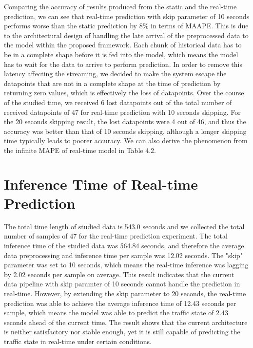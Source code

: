 \documentclass[11pt]{uonthesis}
\begin{document}
Comparing the accuracy of results produced from the static and the real-time prediction, we can see that real-time prediction with skip parameter of 10 seconds performs worse than the static prediction by 8\% in terms of MAAPE. This is due to the architectural design of handling the late arrival of the preprocessed data to the model within the proposed framework. Each chunk of historical data has to be in a complete shape before it is fed into the model, which means the model has to wait for the data to arrive to perform prediction. In order to remove this latency affecting the streaming, we decided to make the system escape the datapoints that are not in a complete shape at the time of prediction by returning zero values, which is effectively the loss of datapoints. Over the course of the studied time, we received 6 lost datapoints out of the total number of received datapoints of 47 for real-time prediction with 10 seconds skipping. For the 20 seconds skipping result, the lost datapoints were 4 out of 46, and thus the accuracy was better than that of 10 seconds skipping, although a longer skipping time typically leads to poorer accuracy. We can also derive the phenomenon from the infinite MAPE of real-time model in Table 4.2. %

\section{Inference Time of Real-time Prediction}

The total time length of studied data is 543.0 seconds and we collected the total number of samples of 47 for the real-time prediction experiment. The total inference time of the studied data was 564.84 seconds, and therefore the average data preprocessing and inference time per sample was 12.02 seconds. The "skip" parameter was set to 10 seconds, which means the real-time inference was lagging by 2.02 seconds per sample on average. This result indicates that the current data pipeline with skip paramter of 10 seconds cannot handle the prediction in real-time. However, by extending the skip parameter to 20 seconds, the real-time prediction was able to achieve the average inference time of 12.43 seconds per sample, which means the model was able to predict the traffic state of 2.43 seconds ahead of the current time. The result shows that the current architecture is neither satisfactory nor stable enough, yet it is still capable of predicting the traffic state in real-time under certain conditions. %
\end{document}
